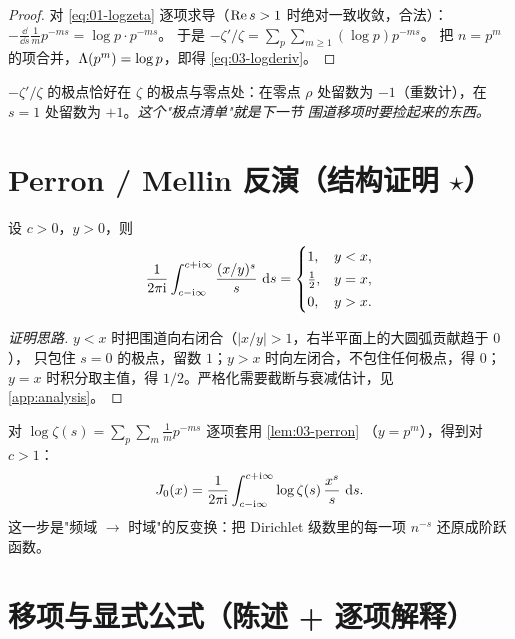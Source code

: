 \begin{proof}
对 \cref{eq:01-logzeta} 逐项求导（$\operatorname{Re} s>1$ 时绝对一致收敛，合法）：
$-\frac{\dd}{\dd s}\frac{1}{m}p^{-ms}=\log p\cdot p^{-ms}$。
于是 $-\zeta'/\zeta=\sum_p\sum_{m\ge1}(\log p)p^{-ms}$。
把 $n=p^m$ 的项合并，$\Lambda(p^m)=\log p$，即得 \cref{eq:03-logderiv}。
\end{proof}

\begin{remark}
$-\zeta'/\zeta$ 的极点恰好在 $\zeta$ 的极点与零点处：在零点 $\rho$ 处留数为
$-1$（重数计），在 $s=1$ 处留数为 $+1$。\emph{这个"极点清单"就是下一节
围道移项时要捡起来的东西。}
\end{remark}

\section{Perron / Mellin 反演（结构证明 $\star$）}
\label{sec:03-perron}

\begin{lemma}[Perron 公式]\label{lem:03-perron}
设 $c>0$，$y>0$，则
\begin{equation}\label{eq:03-perron}
  \frac{1}{2\pi\mathrm{i}}\int_{c-\mathrm{i}\infty}^{c+\mathrm{i}\infty}\frac{(x/y)^{s}}{s}\,\mathop{}\!\mathrm{d} s
  =\begin{cases}1,& y<x,\\[2pt] \tfrac12,& y=x,\\[2pt]0,& y>x.\end{cases}
\end{equation}
\end{lemma}

\begin{proof}[证明思路]
$y<x$ 时把围道向右闭合（$|x/y|>1$，右半平面上的大圆弧贡献趋于 $0$），
只包住 $s=0$ 的极点，留数 $1$；$y>x$ 时向左闭合，不包住任何极点，得 $0$；
$y=x$ 时积分取主值，得 $1/2$。严格化需要截断与衰减估计，见
\cref{app:analysis}。
\end{proof}

对 $\log\zeta(s)=\sum_p\sum_m \frac1m p^{-ms}$ 逐项套用 \cref{lem:03-perron}
（$y=p^m$），得到对 $c>1$：
\begin{equation}\label{eq:03-J-integral}
  J_0(x)=\frac{1}{2\pi\mathrm{i}}\int_{c-\mathrm{i}\infty}^{c+\mathrm{i}\infty}
  \log\zeta(s)\,\frac{x^{s}}{s}\,\mathop{}\!\mathrm{d} s .
\end{equation}
这一步是"频域 $\to$ 时域"的反变换：把 Dirichlet 级数里的每一项 $n^{-s}$
还原成阶跃函数。

\section{移项与显式公式（陈述 + 逐项解释）}
\label{sec:03-explicit}

